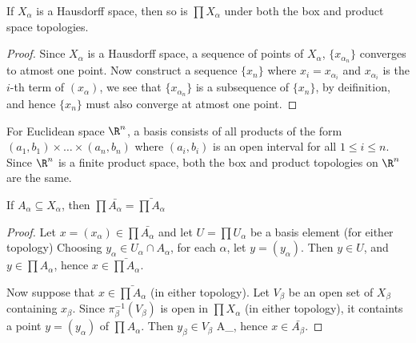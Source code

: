 \begin{theorem}\label{2.1.6}
    If $X_{\alpha}$ is a Hausdorff space, then so is $\prod{X_{\alpha}}$ under both the box and
    product space topologies.
\end{theorem}
\begin{proof}
Since $X_{\alpha}$ is a Hausdorff space, a sequence of points of $X_{\alpha}$, $\{x_{\alpha_n}\}$
converges to atmost one point. Now construct a sequence $\{x_n\}$ where $x_i=x_{\alpha_i}$ and
$x_{\alpha_i}$ is the $i$-th term of  $(x_\alpha)$, we see that $\{x_{\alpha_n}\}$ is a subsequence
of $\{x_n\}$, by deifinition, and hence $\{x_n\}$ must also converge at atmost one point.
\end{proof}

\begin{example}
    For Euclidean space $\R^n$, a basis consists of all products of the form  $(a_1,b_1) \times
    \dots \times (a_n, b_n)$ where $(a_i,b_i)$ is an open interval for all $1 \leq i  \leq n$. Since
    $\R^n$ is a finite product space, both the box and product topologies on  $\R^n$ are the same.
\end{example} 

\begin{theorem}\label{2.1.7}
    If $A_{\alpha} \subseteq X_{\alpha}$, then $\prod{\bar{A_{\alpha}}}=\bar{\prod{A_{\alpha}}}$
\end{theorem}
\begin{proof}
    Let $x=(x_{\alpha}) \in \prod{\bar{A_{\alpha}}}$ and let $U=\prod{U_{\alpha}}$ be a basis
    element (for either topology) Choosing $y_{\alpha} \in U_{\alpha} \cap A_{\alpha}$, for each
    $\alpha$, let  $y=(y_{\alpha})$. Then $y \in U$, and $y \in \prod{A_{\alpha}}$, hence $x \in
    \bar{\prod{A_{\alpha}}}$.

    Now suppose that $x \in \bar{\prod{A_{\alpha}}}$ (in either topology). Let $V_{\beta}$ be an
    open set of $X_{\beta}$ containing $x_{\beta}$. Since $\pi_{\beta}^{-1}(V_{\beta})$ is open in
    $\prod{X_{\alpha}}$ (in either topology), it containts a point $y=(y_{\alpha})$ of
    $\prod{A_{\alpha}}$. Then $y_{\beta} \in V_{\beta}$ \cap A_{\beta}, hence $x \in
    \bar{A_{\beta}}$.
\end{proof}

